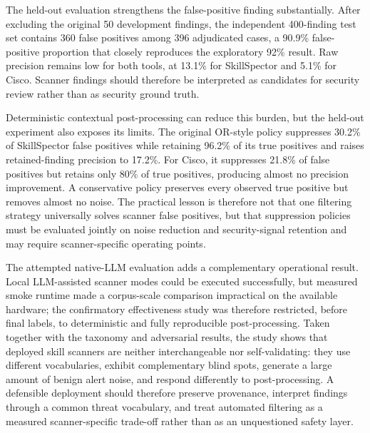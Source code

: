 \documentclass[conference]{IEEEtran}
\begin{document}
The held-out evaluation strengthens the false-positive finding substantially. After excluding the original 50 development findings, the independent 400-finding test set contains 360 false positives among 396 adjudicated cases, a 90.9\% false-positive proportion that closely reproduces the exploratory 92\% result. Raw precision remains low for both tools, at 13.1\% for SkillSpector and 5.1\% for Cisco. Scanner findings should therefore be interpreted as candidates for security review rather than as security ground truth.

Deterministic contextual post-processing can reduce this burden, but the held-out experiment also exposes its limits. The original OR-style policy suppresses 30.2\% of SkillSpector false positives while retaining 96.2\% of its true positives and raises retained-finding precision to 17.2\%. For Cisco, it suppresses 21.8\% of false positives but retains only 80\% of true positives, producing almost no precision improvement. A conservative policy preserves every observed true positive but removes almost no noise. The practical lesson is therefore not that one filtering strategy universally solves scanner false positives, but that suppression policies must be evaluated jointly on noise reduction and security-signal retention and may require scanner-specific operating points.

The attempted native-LLM evaluation adds a complementary operational result. Local LLM-assisted scanner modes could be executed successfully, but measured smoke runtime made a corpus-scale comparison impractical on the available hardware; the confirmatory effectiveness study was therefore restricted, before final labels, to deterministic and fully reproducible post-processing. Taken together with the taxonomy and adversarial results, the study shows that deployed skill scanners are neither interchangeable nor self-validating: they use different vocabularies, exhibit complementary blind spots, generate a large amount of benign alert noise, and respond differently to post-processing. A defensible deployment should therefore preserve provenance, interpret findings through a common threat vocabulary, and treat automated filtering as a measured scanner-specific trade-off rather than as an unquestioned safety layer.
\end{document}
